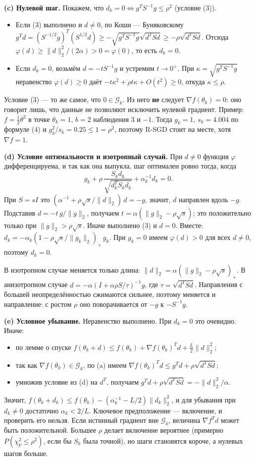 \documentclass[11pt,a4paper]{article}
\newcommand{\G}{\mathcal{G}_k}
\newcommand{\norm}[1]{\lVert #1\rVert_2}
\begin{document}
\textbf{(c) Нулевой шаг.} Покажем, что $d_k=0\iff g^TS^{-1}g\le\rho^2$ (условие (3)).
\begin{itemize}
\item Если (3) выполнено и $d\ne0$, по Коши — Буняковскому
$g^Td=(S^{-1/2}g)^T(S^{1/2}d)\ge-\sqrt{g^TS^{-1}g}\sqrt{d^TSd}\ge-\rho\sqrt{d^TSd}$. Отсюда
$\varphi(d)\ge\norm d^2/(2\alpha)>0=\varphi(0)$, то есть $d_k=0$.
\item Если $d_k=0$, возьмём $d=-tS^{-1}g$ и устремим $t\to0^+$. При $\kappa=\sqrt{g^TS^{-1}g}$
неравенство $\varphi(d)\ge0$ даёт $-t\kappa^2+\rho t\kappa+O(t^2)\ge0$, откуда $\kappa\le\rho$.
\end{itemize}
Условие (3) — то же самое, что $0\in\G$. Из него \textbf{не} следует $\nabla f(\theta_k)=0$: оно
говорит лишь, что данные не позволяют исключить нулевой градиент. Пример: $f=\tfrac12\theta^2$ в
точке $\theta_k=1$, $b=2$ наблюдения $3$ и $-1$. Тогда $g_k=1$, $s_k=4.004$ по формуле (4) и
$g_k^2/s_k=0.25\le1=\rho^2$, поэтому R-SGD стоит на месте, хотя $\nabla f=1$.

\textbf{(d) Условие оптимальности и изотропный случай.} При $d\ne0$ функция $\varphi$
дифференцируема, и так как она выпукла, шаг оптимален ровно тогда, когда
\begin{equation*}
g_k+\rho\,\frac{S_kd_k}{\sqrt{d_k^TS_kd_k}}+\alpha_k^{-1}d_k=0 .
\end{equation*}
При $S=sI$ это $(\alpha^{-1}+\rho\sqrt s/\norm d)\,d=-g$, значит, $d$ направлен вдоль $-g$.
Подставив $d=-t\,g/\norm g$, получаем $t=\alpha(\norm g-\rho\sqrt s)$; это положительно только при
$\norm g>\rho\sqrt s$. Иначе выполнено (3) и $d=0$. Вместе:
$d_k=-\alpha_k(1-\rho\sqrt s/\norm{g_k})_+\,g_k$. При $g_k=0$ имеем $\varphi(d)>0$ для всех $d\ne0$,
поэтому $d_k=0$.

В изотропном случае меняется только длина: $\norm{d}=\alpha(\norm g-\rho\sqrt s)_+$. В анизотропном
случае $d=-\alpha(I+\alpha\rho S/\tau)^{-1}g$, где $\tau=\sqrt{d^TSd}$. Направления с большей
неопределённостью сжимаются сильнее, поэтому меняется и направление: с ростом $\rho$ оно
поворачивается от $-g$ к $-S^{-1}g$.

\textbf{(e) Условное убывание.} Неравенство выполнено. При $d_k=0$ это очевидно. Иначе:
\begin{itemize}
\item по лемме о спуске $f(\theta_k+d)\le f(\theta_k)+\nabla f(\theta_k)^Td+\tfrac L2\norm d^2$;
\item так как $\nabla f(\theta_k)\in\G$, по (a) имеем $\nabla f(\theta_k)^Td\le g^Td+\rho\sqrt{d^TSd}$;
\item умножив условие из (d) на $d^T$, получаем $g^Td+\rho\sqrt{d^TSd}=-\norm d^2/\alpha$.
\end{itemize}
Значит, $f(\theta_k+d_k)\le f(\theta_k)-(\alpha_k^{-1}-L/2)\norm{d_k}^2$, и для убывания при
$d_k\ne0$ достаточно $\alpha_k<2/L$. Ключевое предположение — включение, и проверить его нельзя.
Если истинный градиент вне $\G$, величина $\nabla f^Td$ может быть положительной. Большее $\rho$ делает
включение вероятнее (примерно $P(\chi^2_p\le\rho^2)$, если бы $S_k$ была точной), но шаги становятся
короче, а нулевых шагов больше.
\end{document}
